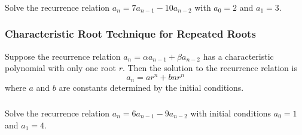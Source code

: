 \documentclass[11pt, compress]{beamer}
\begin{document}
\begin{frame}
\frametitle{}
\begin{example}[2.4.6]Solve the recurrence relation \(a_n = 7a_{n-1} - 10 a_{n-2}\) with \(a_0 = 2\) and \(a_1 = 3\).
\end{example}
\end{frame}
 
\begin{frame}
\frametitle{Characteristic Root Technique for Repeated Roots}
 Suppose the recurrence relation \(a_n = \alpha a_{n-1} + \beta a_{n-2}\) has a characteristic polynomial with only one root \(r\). Then the solution to the recurrence relation is%
\begin{equation*}
a_n = ar^n + bnr^n
\end{equation*}
where \(a\) and \(b\) are constants determined by the initial conditions.
\end{frame}
 
\begin{frame}
\frametitle{}
\begin{example}[2.4.7]Solve the recurrence relation \(a_n = 6a_{n-1} - 9a_{n-2}\) with initial conditions \(a_0 = 1\) and \(a_1 = 4\).
\end{example}
\end{frame}
 
\end{document}
